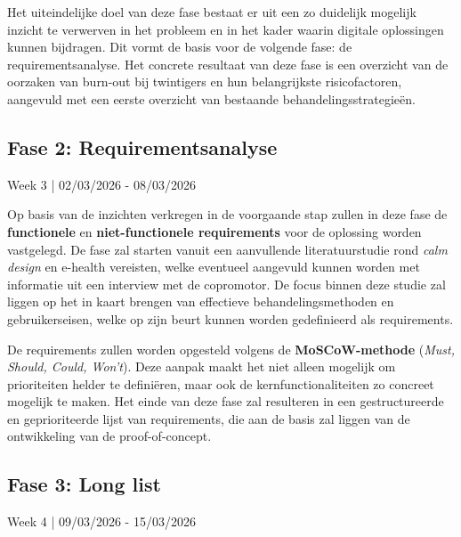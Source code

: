 \vspace{1em}

Het uiteindelijke doel van deze fase bestaat er uit een zo duidelijk mogelijk inzicht te verwerven in het probleem en in het kader waarin digitale oplossingen kunnen bijdragen. Dit vormt de basis voor de volgende fase: de requirementsanalyse. Het concrete resultaat van deze fase is een overzicht van de oorzaken van burn-out bij twintigers en hun belangrijkste risicofactoren, aangevuld met een eerste overzicht van bestaande behandelingsstrategieën.

\vspace{1em}

\subsection{Fase 2: Requirementsanalyse}%
\label{subsec:requirementsanalyse}
Week 3 \hspace{1em}|\hspace{1em} 02/03/2026 - 08/03/2026

\vspace{1em}

Op basis van de inzichten verkregen in de voorgaande stap zullen in deze fase de \textbf{functionele} en \textbf{niet-functionele requirements} voor de oplossing worden vastgelegd. De fase zal starten vanuit een aanvullende literatuurstudie rond \emph{calm design} en e-health vereisten, welke eventueel aangevuld kunnen worden met informatie uit een interview met de copromotor. De focus binnen deze studie zal liggen op het in kaart brengen van effectieve behandelingsmethoden en gebruikerseisen, welke op zijn beurt kunnen worden gedefinieerd als requirements. 

\vspace{1em}

De requirements zullen worden opgesteld volgens de \textbf{MoSCoW-methode} (\emph{Must, Should, Could, Won’t}). Deze aanpak maakt het niet alleen mogelijk om prioriteiten helder te definiëren, maar ook de kernfunctionaliteiten zo concreet mogelijk te maken. Het einde van deze fase zal resulteren in een gestructureerde en geprioriteerde lijst van requirements, die aan de basis zal liggen van de ontwikkeling van de proof-of-concept.

\vspace{1em}

\subsection{Fase 3: Long list}%
\label{subsec:Longlist}
Week 4 \hspace{1em}|\hspace{1em} 09/03/2026 - 15/03/2026

